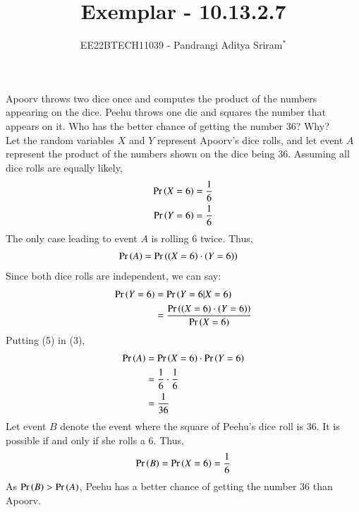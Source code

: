 \documentclass[journal,12pt,twocolumn]{IEEEtran}
\theoremstyle{remark}
\begin{document}

\vspace{3cm}

\title{Exemplar - 10.13.2.7}
\author{EE22BTECH11039 - Pandrangi Aditya Sriram$^{*}$%
}
\maketitle
\newpage
\bigskip

\renewcommand{\thefigure}{\theenumi}
\renewcommand{\thetable}{\theenumi}

Apoorv throws two dice once and computes the product of the numbers appearing
on the dice. Peehu throws one die and squares the number that appears on it. Who
has the better chance of getting the number 36? Why?\\\solution
Let the random variables $X$ and $Y$ represent Apoorv's dice rolls, and let event $A$ represent the product of the numbers shown on the dice being 36. Assuming all dice rolls are equally likely,
\begin{align}
\Pr\left(X=6\right) &= \frac{1}{6}\\
\Pr\left(Y=6\right) &= \frac{1}{6}
\end{align}
The only case leading to event $A$ is rolling 6 twice. Thus, 
\begin{align}
\Pr\left(A\right) &= \Pr\left((X=6)\cdot(Y=6)\right)
\end{align}
Since both dice rolls are independent, we can say:
\begin{align}
\Pr\left(Y=6\right) &= \Pr\left(Y=6 | X=6\right)\\
&= \frac{\Pr\left((X=6)\cdot(Y=6)\right)}{\Pr\left(X=6\right)}
\end{align}
Putting (5) in (3),
\begin{align}
\Pr\left(A\right) &= \Pr\left(X=6\right)\cdot\Pr\left(Y=6\right)\\
&= \frac{1}{6}\cdot\frac{1}{6}\\
&= \frac{1}{36}
\end{align}
Let event $B$ denote the event where the square of Peehu's dice roll is 36. It is possible if and only if she rolls a 6. Thus,
\begin{align}
\Pr\left(B\right) = \Pr\left(X=6\right) = \frac{1}{6} 
\end{align}
As $\Pr\left(B\right) > \Pr\left(A\right)$, Peehu has a better chance of getting the number 36 than Apoorv.
\end{document}
